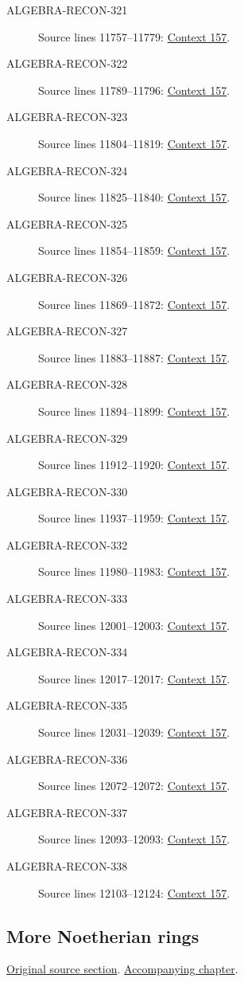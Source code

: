 \begin{description}
\item[ALGEBRA-RECON-321] Source lines 11757--11779: \hyperlink{algebra-context-157}{Context 157}.
\item[ALGEBRA-RECON-322] Source lines 11789--11796: \hyperlink{algebra-context-157}{Context 157}.
\item[ALGEBRA-RECON-323] Source lines 11804--11819: \hyperlink{algebra-context-157}{Context 157}.
\item[ALGEBRA-RECON-324] Source lines 11825--11840: \hyperlink{algebra-context-157}{Context 157}.
\item[ALGEBRA-RECON-325] Source lines 11854--11859: \hyperlink{algebra-context-157}{Context 157}.
\item[ALGEBRA-RECON-326] Source lines 11869--11872: \hyperlink{algebra-context-157}{Context 157}.
\item[ALGEBRA-RECON-327] Source lines 11883--11887: \hyperlink{algebra-context-157}{Context 157}.
\item[ALGEBRA-RECON-328] Source lines 11894--11899: \hyperlink{algebra-context-157}{Context 157}.
\item[ALGEBRA-RECON-329] Source lines 11912--11920: \hyperlink{algebra-context-157}{Context 157}.
\item[ALGEBRA-RECON-330] Source lines 11937--11959: \hyperlink{algebra-context-157}{Context 157}.
\item[ALGEBRA-RECON-332] Source lines 11980--11983: \hyperlink{algebra-context-157}{Context 157}.
\item[ALGEBRA-RECON-333] Source lines 12001--12003: \hyperlink{algebra-context-157}{Context 157}.
\item[ALGEBRA-RECON-334] Source lines 12017--12017: \hyperlink{algebra-context-157}{Context 157}.
\item[ALGEBRA-RECON-335] Source lines 12031--12039: \hyperlink{algebra-context-157}{Context 157}.
\item[ALGEBRA-RECON-336] Source lines 12072--12072: \hyperlink{algebra-context-157}{Context 157}.
\item[ALGEBRA-RECON-337] Source lines 12093--12093: \hyperlink{algebra-context-157}{Context 157}.
\item[ALGEBRA-RECON-338] Source lines 12103--12124: \hyperlink{algebra-context-157}{Context 157}.
\end{description}

\subsection{More Noetherian rings}
\hypertarget{algebra-source-section-Noetherian-again}{}
\noindent\href{https://github.com/stacks/stacks-project/blob/a04446e57ec1fbc252a871afcec7752fb2807b14/algebra.tex\#L12149}{Original source section}. \href{algebra.pdf\#nameddest=section-Noetherian-again}{Accompanying chapter}.

